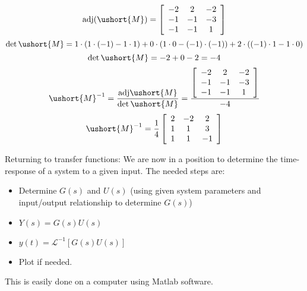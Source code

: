 \documentclass{book}
\newcommand{\LT}{\mathcal{L}}
\newcommand{\adj}{\text{adj}}
\def\ubar#1{\ushort{#1}}
\begin{document}
\[ \adj(\ubar{M})=\left[\begin{array}{c c c}
-2 & 2 & -2 \\ -1 & -1 & -3 \\ -1 & -1 & 1
\end{array}\right] \]
\[ \det\ubar{M} = 1\cdot(1\cdot(-1)-1\cdot1) + 0\cdot(1\cdot0-(-1)\cdot(-1)) + 2\cdot((-1)\cdot1-1\cdot0) \]
\[ \det\ubar{M} = -2+0-2 = -4 \]
\[ \ubar{M}^{-1} = \frac{\adj{\ubar{M}}}{\det{\ubar{M}}} = \frac{\left[\begin{array}{c c c}
	-2 & 2 & -2 \\ -1 & -1 & -3 \\ -1 & -1 & 1
	\end{array}\right]}{-4} \]
\[ \ubar{M}^{-1} = \frac{1}{4}\left[\begin{array}{c c c}
2 & -2 & 2 \\ 1 & 1 & 3 \\ 1 & 1 & -1
\end{array}\right] \]

Returning to transfer functions: We are now in a position to determine the time-response of a system to a given input. The needed steps are:
\begin{itemize}
	\item Determine $ G(s) $ and $ U(s) $ (using given system parameters and input/output relationship to determine $ G(s) $)
	\item $ Y(s) = G(s)U(s) $
	\item $ y(t) = \LT^{-1}[G(s)U(s)] $
	\item Plot if needed.
\end{itemize}
This is easily done on a computer using Matlab software.
\end{document}
